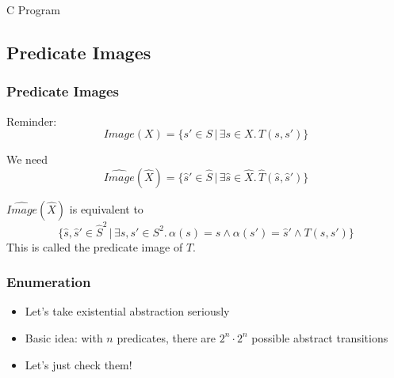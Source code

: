 \begin{frame}[fragile]
\hspace{0.1cm} C Program
\\

\end{frame}


\subsection{Predicate Images}

\begin{frame}
\frametitle{Predicate Images}

Reminder:
\[ \mathit{Image}(X) = \{ s' \in S \,|\, \exists s\in X.\, T(s,s') \} \]
\vfill

We need
%
\[ \widehat{\mathit{Image}}(\hat X) = \{ \hat s' \in \hat S \,|\,
\exists \hat s \in \hat X.\, \hat T(\hat s,\hat s') \} \]
\vfill

$\widehat{\mathit{Image}}(\hat X)$ is equivalent to
%
\[ \{ \hat s, \hat s' \in \hat S^2 \,|\, \exists s,s' \in S^2.\,
\alpha(s)=\hat s \land \alpha(s')=\hat s' \land T(s,s') \} \]
%
This is called the \alert{predicate image} of $T$.

\end{frame}


\begin{frame}
\frametitle{Enumeration}

\begin{itemize}
\item Let's take existential abstraction seriously
\vfill

\item Basic idea: with $n$ predicates, there are $2^n\cdot 2^n$
possible abstract transitions
\vfill

\item Let's just check them!
\end{itemize}

\end{frame}

